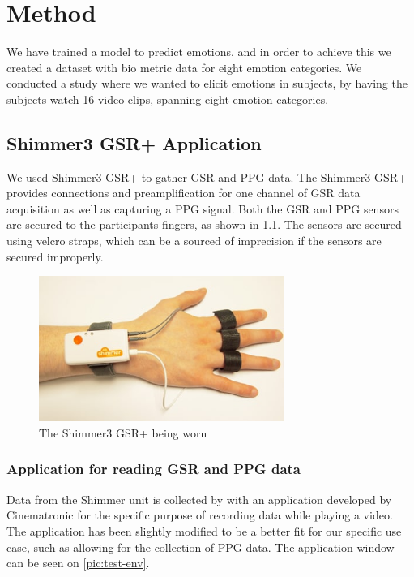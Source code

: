 \chapter{Method}
We have trained a model to predict emotions, and in order to achieve this we created a dataset with bio metric data for eight emotion categories. We conducted a study where we wanted to elicit emotions in subjects, by having the subjects watch 16 video clips, spanning eight emotion categories.

\section{Shimmer3 GSR+ Application} \label{sec:shimmer}
We used Shimmer3 GSR+ \cite{shimmer3} to gather GSR and PPG data. The Shimmer3 GSR+ provides connections and preamplification for one channel of GSR data acquisition as well as capturing a PPG signal. Both the GSR and PPG sensors are secured to the participants fingers, as shown in \cref{pic:shimmer}. The sensors are secured using velcro straps, which can be a sourced of imprecision if the sensors are secured improperly.

\begin{figure}[H]
    \centering
    \includegraphics[width=8cm]{pictures/shimmer.jpg}
    \caption{The Shimmer3 GSR+ being worn}
    \label{pic:shimmer}
\end{figure}

\subsection{Application for reading GSR and PPG data}
Data from the Shimmer unit is collected by with an application developed by Cinematronic for the specific purpose of recording data while playing a video. The application has been slightly modified to be a better fit for our specific use case, such as allowing for the collection of PPG data. The application window can be seen on \cref{pic:test-env}.

